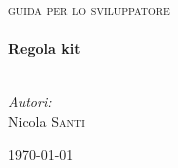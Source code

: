 \begin{titlepage}
 
\begin{center}
 
 
 
\textsc{\LARGE }\\[1.5cm]
 
\textsc{\Large guida per lo sviluppatore }\\[0.5cm]
 
\HRule \\[0.4cm]
{ \huge \bfseries Regola kit}\\[0.4cm]
 
\HRule \\[1.5cm]

 
\begin{minipage}{0.9\textwidth}
\begin{flushright} \large
\emph{Autori:}\\
Nicola \textsc{Santi}
\end{flushright}
\end{minipage}
 
\vfill
 
{\large \today}
 
\end{center}
 
\end{titlepage}
